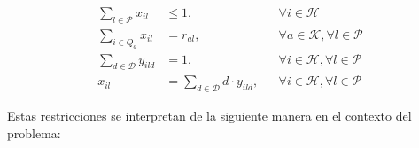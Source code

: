\documentclass[conference]{IEEEtran}
\begin{document}
\begin{align}
    \sum_{l \in \mathcal{P}} x_{il}  & \leq 1,                                     &  & \forall i \in \mathcal{H} \label{eq:constraint_capacity_updated}                              \\
    \sum_{i \in Q_a} x_{il}          & = r_{al},                                   &  & \forall a \in \mathcal{K}, \forall l \in \mathcal{P} \label{eq:constraint_skills_updated}     \\
    \sum_{d \in \mathcal{D}} y_{ild} & = 1,                                        &  & \forall i \in \mathcal{H}, \forall l \in \mathcal{P} \label{eq:constraint_force_one_fraction} \\
    x_{il}                           & = \sum_{d \in \mathcal{D}} d \cdot y_{ild}, &  & \forall i \in \mathcal{H}, \forall l \in \mathcal{P} \label{eq:constraint_define_x_from_y}
\end{align}

Estas restricciones se interpretan de la siguiente manera en el contexto del problema:
\end{document}
